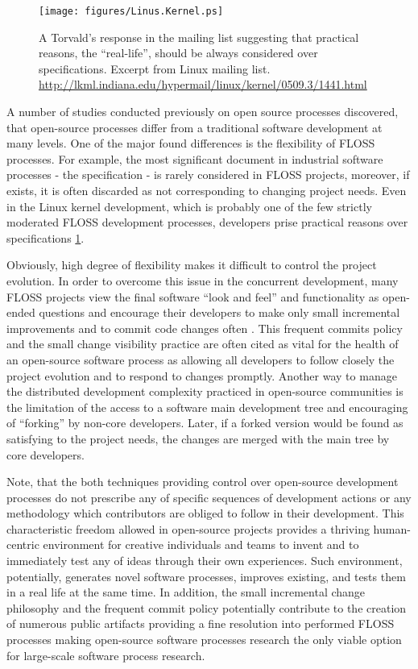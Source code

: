 \begin{figure}[ht!]
   \centering
   \texttt{[image: figures/Linus.Kernel.ps]}
   \caption{A Torvald's response in the mailing list suggesting that practical reasons, the ``real-life'', 
   should be always considered over specifications.
   Excerpt from Linux mailing list. \url{http://lkml.indiana.edu/hypermail/linux/kernel/0509.3/1441.html}}
   \label{fig:kernel}
\end{figure}

A number of studies conducted previously on open source processes discovered, that open-source processes 
differ from a traditional software development at many levels. One of the major found differences 
is the flexibility of FLOSS processes. For example, the most significant document in industrial software 
processes - the specification - is rarely considered in FLOSS projects, moreover, if exists, it is often 
discarded as not corresponding to changing project needs. Even in the Linux kernel development, which is 
probably one of the few strictly moderated FLOSS development processes, developers prise practical reasons 
over specifications \ref{fig:kernel}.

Obviously, high degree of flexibility makes it difficult to control the project evolution. 
In order to overcome this issue in the concurrent development, many FLOSS projects view the final 
software ``look and feel'' and functionality as open-ended questions and encourage their developers to 
make only small incremental improvements and to commit code changes often 
\cite{so-checkin} \cite{git-best-practices1}. This frequent commits policy and the small change visibility 
practice are often cited as vital for the health of an open-source software process as allowing all developers 
to follow closely the project evolution and to respond to changes promptly.
Another way to manage the distributed development complexity practiced in open-source communities is the 
limitation of the access to a software main development tree and encouraging of ``forking'' by non-core developers. 
Later, if a forked version would be found as satisfying to the project needs, the changes are merged with the 
main tree by core developers.

Note, that the both techniques providing control over open-source development processes do not prescribe 
any of specific sequences of development actions or any methodology which contributors are obliged to follow 
in their development.
This characteristic freedom allowed in open-source projects provides a thriving human-centric environment for 
creative individuals and teams to invent and to immediately test any of ideas through their own experiences. 
Such environment, potentially, generates novel software processes, improves existing, and tests them in a real life
at the same time. 
In addition, the small incremental change philosophy and the frequent commit policy potentially contribute to the 
creation of numerous public artifacts providing a fine resolution into performed FLOSS processes making open-source 
software processes research the only viable option for large-scale software process research.

